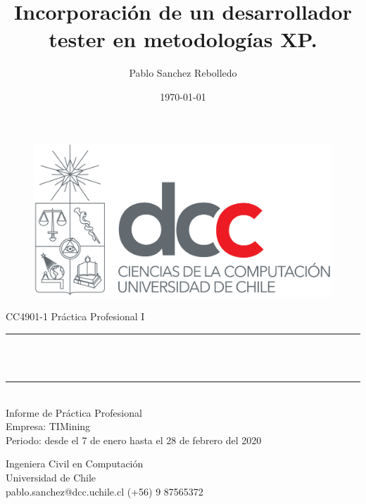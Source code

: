 \documentclass[11pt]{article}
\title{Incorporación de un desarrollador tester en metodologías XP.}
\author{Pablo Sanchez Rebolledo}
\date{\today}
\makeatletter
\let\thetitle\@title
\let\theauthor\@author
\let\thedate\@date
\makeatother
\begin{document}
	
	\begin{titlepage}
		\centering
		\vspace*{0.0 cm}
		
		\begin{figure}
			\centering
			\includegraphics[scale=0.25]{img/dcc-logo}
			\label{fig:dcc-logo}
		\end{figure}
		
		\Large CC4901-1 Práctica Profesional I\\[0.5 cm]
		\rule{\linewidth}{0.2 mm} \\[0.4 cm]
		{ \LARGE \bfseries \thetitle}\\
		\rule{\linewidth}{0.2 mm} \\[1.5 cm]
		
		\Large Informe de Práctica Profesional\\[0.5 cm]
		\Large Empresa: TIMining\\
		\Large Periodo: desde el 7 de enero hasta el 28 de febrero del 2020	
			
		\vfill
		
		\begin{minipage}{0.6\textwidth}
			\begin{center} \Large
				\theauthor\linebreak
				Ingeniera Civil en Computación\\
				Universidad de Chile\\
				pablo.sanchez@dcc.uchile.cl \linebreak
				(+56) 9 87565372\\
				\thedate\\
			\end{center}
		\end{minipage}\\[2 cm]
		

	\end{titlepage}
	
\end{document}
